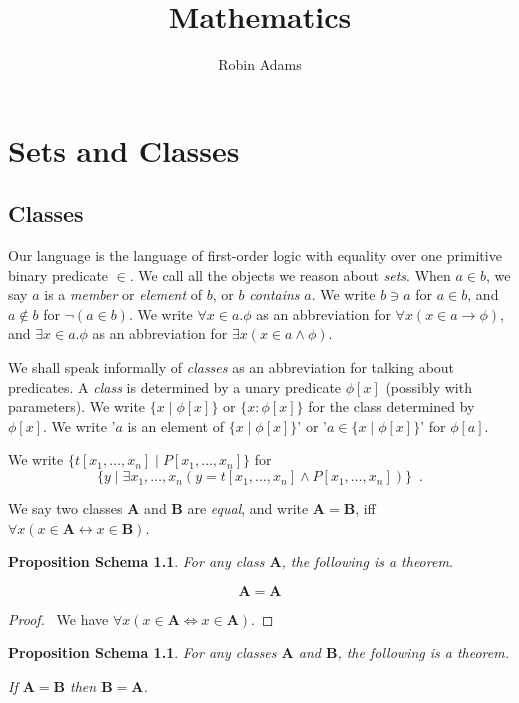 \documentclass{book}
\title{Mathematics}
\author{Robin Adams}
\let\qed\relax
\newtheorem{props}[ax]{Proposition Schema}
\theoremstyle{definition}
\begin{document}
\maketitle

\chapter{Sets and Classes}

\section{Classes}

Our language is the language of first-order logic with equality over one primitive binary predicate $\in$. We call all the objects we reason about \emph{sets}. When $a \in b$, we say $a$ is a \emph{member} or \emph{element} of $b$, or $b$ \emph{contains} $a$. We write $b \ni a$ for $a \in b$, and $a \notin b$ for $\neg(a \in b)$. We write $\forall x \in a. \phi$ as an abbreviation for $\forall x(x \in a \rightarrow \phi)$, and $\exists x \in a. \phi$ as an abbreviation for $\exists x(x \in a \wedge \phi)$.

We shall speak informally of \emph{classes} as an abbreviation for talking about predicates. A \emph{class} is determined by a unary predicate $\phi[x]$ (possibly with parameters). We write $\{ x \mid \phi[x] \}$ or $\{ x : \phi[x] \}$ for the class determined by $\phi[x]$. We write '$a$ is an element of $\{x \mid \phi[x]\}$' or '$a \in \{x \mid \phi[x]\}$' for $\phi[a]$.

We write $\{t[x_1, \ldots, x_n] \mid P[x_1, \ldots, x_n] \}$ for 
\[ \{y \mid \exists x_1, \ldots, x_n (y = t[x_1, \ldots, x_n] \wedge P[x_1, \ldots, x_n]) \} \enspace . \]

We say two classes $\mathbf{A}$ and $\mathbf{B}$ are \emph{equal}, and write $\mathbf{A} = \mathbf{B}$, iff $\forall x (x \in \mathbf{A} \leftrightarrow x \in \mathbf{B})$.

\begin{props}
For any class $\mathbf{A}$, the following is a theorem.

\[ \mathbf{A} = \mathbf{A} \]
\end{props}

\begin{proof}
\pf\ We have $\forall x (x \in \mathbf{A} \Leftrightarrow x \in \mathbf{A})$. \qed
\end{proof}

\begin{props}
For any classes $\mathbf{A}$ and $\mathbf{B}$, the following is a theorem.

If $\mathbf{A} = \mathbf{B}$ then $\mathbf{B} = \mathbf{A}$.
\end{props}
\end{document}
